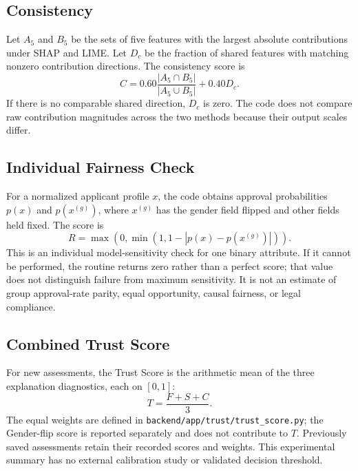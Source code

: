 \subsection{Consistency}
Let $A_5$ and $B_5$ be the sets of five features with the largest absolute contributions under SHAP and LIME. Let $D_c$ be the fraction of shared features with matching nonzero contribution directions. The consistency score is
\begin{equation}
  C=0.60\frac{|A_5\cap B_5|}{|A_5\cup B_5|}+0.40D_c.
  \label{eq:consistency}
\end{equation}
If there is no comparable shared direction, $D_c$ is zero. The code does not compare raw contribution magnitudes across the two methods because their output scales differ.

\subsection{Individual Fairness Check}
For a normalized applicant profile $x$, the code obtains approval probabilities $p(x)$ and $p(x^{(g)})$, where $x^{(g)}$ has the gender field flipped and other fields held fixed. The score is
\begin{equation}
  R=\max\left(0,\min\left(1,1-|p(x)-p(x^{(g)})|\right)\right).
  \label{eq:counterfactual}
\end{equation}
This is an individual model-sensitivity check for one binary attribute. If it cannot be performed, the routine returns zero rather than a perfect score; that value does not distinguish failure from maximum sensitivity. It is not an estimate of group approval-rate parity, equal opportunity, causal fairness, or legal compliance.

\subsection{Combined Trust Score}
For new assessments, the Trust Score is the arithmetic mean of the three explanation diagnostics, each on $[0,1]$:
\begin{equation}
  T=\frac{F+S+C}{3}.
  \label{eq:trust-score}
\end{equation}
The equal weights are defined in \texttt{backend/app/trust/trust\_score.py}; the Gender-flip score is reported separately and does not contribute to $T$. Previously saved assessments retain their recorded scores and weights. This experimental summary has no external calibration study or validated decision threshold.

